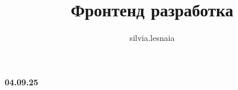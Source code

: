 \documentclass{article}
\title{Фронтенд разработка}
\author{silvia.lesnaia }
\begin{document}
\maketitle

\textbf{04.09.25}

\section{}
\end{document}
